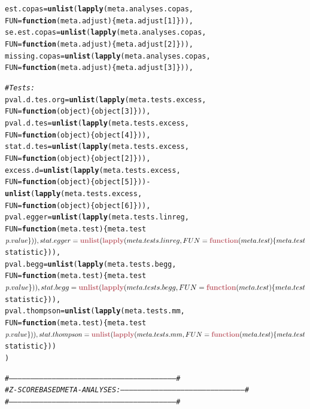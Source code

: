 \documentclass[11pt,a4paper,twoside]{book}\usepackage[]{graphicx}\usepackage[]{color}
\makeatletter
\newcommand{\hlcom}[1]{\textcolor[rgb]{0.678,0.584,0.686}{\textit{#1}}}%
\newcommand{\hlkwd}[1]{\textcolor[rgb]{0.737,0.353,0.396}{\textbf{#1}}}%
\newenvironment{kframe}{%
 \def\at@end@of@kframe{}%
 \ifinner\ifhmode%
  \def\at@end@of@kframe{\end{minipage}}%
  \begin{minipage}{\columnwidth}%
 \fi\fi%
 \def\FrameCommand##1{\hskip\@totalleftmargin \hskip-\fboxsep
 \colorbox{shadecolor}{##1}\hskip-\fboxsep
     \hskip-\linewidth \hskip-\@totalleftmargin \hskip\columnwidth}%
 \MakeFramed {\advance\hsize-\width
   \@totalleftmargin\z@ \linewidth\hsize
   \@setminipage}}%
 {\par\unskip\endMakeFramed%
 \at@end@of@kframe}
\newenvironment{knitrout}{}{} %
\makeatother
\begin{document}
\begin{knitrout}
\begin{kframe}
\begin{alltt}
  est.copas = \hlkwd{unlist}(\hlkwd{lapply}(meta.analyses.copas, 
                           FUN = \hlkwd{function}(meta.adjust)\{meta.adjust[1]\})),
  se.est.copas = \hlkwd{unlist}(\hlkwd{lapply}(meta.analyses.copas, 
                           FUN = \hlkwd{function}(meta.adjust)\{meta.adjust[2]\})),
  missing.copas = \hlkwd{unlist}(\hlkwd{lapply}(meta.analyses.copas, 
                           FUN = \hlkwd{function}(meta.adjust)\{meta.adjust[3]\})),
  
\hlcom{  #Tests:}
  pval.d.tes.org = \hlkwd{unlist}(\hlkwd{lapply}(meta.tests.excess, 
                             FUN = \hlkwd{function}(object)\{object[3]\})),
  pval.d.tes = \hlkwd{unlist}(\hlkwd{lapply}(meta.tests.excess, 
                             FUN = \hlkwd{function}(object)\{object[4]\})),
  stat.d.tes = \hlkwd{unlist}(\hlkwd{lapply}(meta.tests.excess, 
                             FUN = \hlkwd{function}(object)\{object[2]\})),
  excess.d = \hlkwd{unlist}(\hlkwd{lapply}(meta.tests.excess, 
                             FUN = \hlkwd{function}(object)\{object[5]\})) - 
    \hlkwd{unlist}(\hlkwd{lapply}(meta.tests.excess, 
                  FUN = \hlkwd{function}(object)\{object[6]\})),
  pval.egger = \hlkwd{unlist}(\hlkwd{lapply}(meta.tests.linreg, 
                             FUN = \hlkwd{function}(meta.test)\{meta.test$p.value\})),
  stat.egger = \hlkwd{unlist}(\hlkwd{lapply}(meta.tests.linreg, 
                             FUN = \hlkwd{function}(meta.test)\{meta.test$statistic\})),
  pval.begg = \hlkwd{unlist}(\hlkwd{lapply}(meta.tests.begg, 
                             FUN = \hlkwd{function}(meta.test)\{meta.test$p.value\})),
  stat.begg = \hlkwd{unlist}(\hlkwd{lapply}(meta.tests.begg, 
                             FUN = \hlkwd{function}(meta.test)\{meta.test$statistic\})),
  pval.thompson = \hlkwd{unlist}(\hlkwd{lapply}(meta.tests.mm, 
                             FUN = \hlkwd{function}(meta.test)\{meta.test$p.value\})),
  stat.thompson = \hlkwd{unlist}(\hlkwd{lapply}(meta.tests.mm, 
                             FUN = \hlkwd{function}(meta.test)\{meta.test$statistic\}))
)


\hlcom{#--------------------------------------------------------------------------------------------------------------------#}
\hlcom{# Z-SCORE BASED META-ANALYSES: --------------------------------------------------------------------------------------#}
\hlcom{#--------------------------------------------------------------------------------------------------------------------#}


\end{alltt}
\end{kframe}
\end{knitrout}
\end{document}
